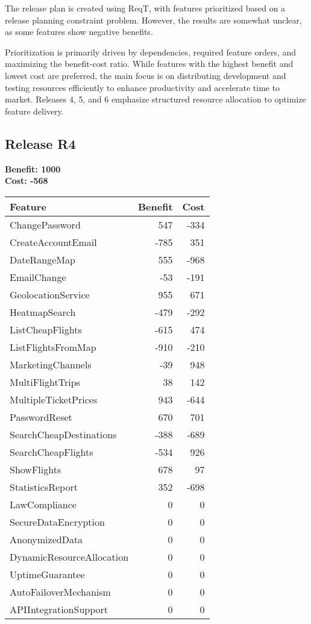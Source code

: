 The release plan is created using ReqT, with features prioritized based on a release planning constraint problem. However, the results are somewhat unclear, as some features show negative benefits.

Prioritization is primarily driven by dependencies, required feature orders, and maximizing the benefit-cost ratio. While features with the highest benefit and lowest cost are preferred, the main focus is on distributing development and testing resources efficiently to enhance productivity and accelerate time to market. Releases 4, 5, and 6 emphasize structured resource allocation to optimize feature delivery.

\subsection{Release R4}
\textbf{Benefit: 1000} \\
\textbf{Cost: -568} \\

\begin{tabular}{lrr}
\toprule
\textbf{Feature} & \textbf{Benefit} & \textbf{Cost} \\
\midrule
ChangePassword & 547 & -334 \\
CreateAccountEmail & -785 & 351 \\
DateRangeMap & 555 & -968 \\
EmailChange & -53 & -191 \\
GeolocationService & 955 & 671 \\
HeatmapSearch & -479 & -292 \\
ListCheapFlights & -615 & 474 \\
ListFlightsFromMap & -910 & -210 \\
MarketingChannels & -39 & 948 \\
MultiFlightTrips & 38 & 142 \\
MultipleTicketPrices & 943 & -644 \\
PasswordReset & 670 & 701 \\
SearchCheapDestinations & -388 & -689 \\
SearchCheapFlights & -534 & 926 \\
ShowFlights & 678 & 97 \\
StatisticsReport & 352 & -698 \\
LawCompliance & 0 & 0 \\
SecureDataEncryption & 0 & 0 \\
AnonymizedData & 0 & 0 \\
DynamicResourceAllocation & 0 & 0 \\
UptimeGuarantee & 0 & 0 \\
AutoFailoverMechanism & 0 & 0 \\
APIIntegrationSupport & 0 & 0 \\
\bottomrule 
\end{tabular}

